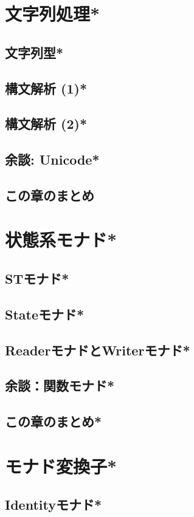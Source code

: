 \documentclass[a5paper,twoside,fleqn]{jsbook}
\begin{document}
\chapter{文字列処理*}
\section{文字列型*}
\section{構文解析 (1)*}
\section{構文解析 (2)*}
\section{余談: Unicode*}
\section{この章のまとめ}

\chapter{状態系モナド*}
\section{STモナド*}
\section{Stateモナド*}
\section{ReaderモナドとWriterモナド*}
\section{余談：関数モナド*}
\section{この章のまとめ*}

\chapter{モナド変換子*}
\section{Identityモナド*}
\end{document}
